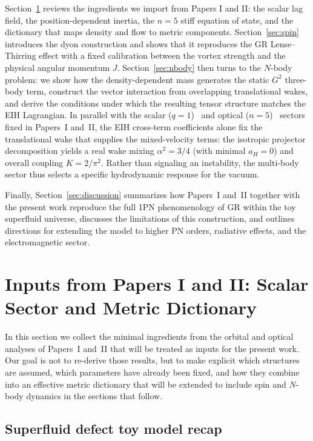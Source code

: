 \documentclass[11pt]{article}
\begin{document}
Section~\ref{sec:inputs} reviews the ingredients we import from Papers I and II:
the scalar lag field, the position-dependent inertia, the $n=5$ stiff equation
of state, and the dictionary that maps density and flow to metric components.
Section~\ref{sec:spin} introduces the dyon construction and shows that it
reproduces the GR Lense--Thirring effect with a fixed calibration between the
vortex strength and the physical angular momentum $J$.
Section~\ref{sec:nbody} then turns to the $N$-body problem: we show how the
density-dependent mass generates the static $G^2$ three-body term, construct
the vector interaction from overlapping translational wakes, and derive the
conditions under which the resulting tensor structure matches the EIH
Lagrangian.
In parallel with the scalar ($q=1$)~\cite{Norris:2025Orbits} and optical ($n=5$)~\cite{Norris:Paper2}
sectors fixed in Papers~I and~II, the EIH cross-term coefficients alone fix the
translational wake that supplies the mixed-velocity terms: the isotropic
projector decomposition yields a real wake mixing $\alpha^2=3/4$ (with minimal
$a_H=0$) and overall coupling $K=2/\pi^2$.
Rather than signaling an instability, the multi-body sector thus selects a
specific hydrodynamic response for the vacuum.

Finally, Section~\ref{sec:discussion} summarizes how Papers~I and~II together
with the present work reproduce the full 1PN phenomenology of GR within the toy
superfluid universe, discusses the limitations of this construction, and
outlines directions for extending the model to higher PN orders, radiative
effects, and the electromagnetic sector.

\section{Inputs from Papers I and II: Scalar Sector and Metric Dictionary}
\label{sec:inputs}

In this section we collect the minimal ingredients from the orbital
and optical analyses of Papers~I and~II that will be treated as inputs
for the present work.
Our goal is not to re-derive those results, but to make explicit
which structures are assumed, which parameters have already been fixed,
and how they combine into an effective metric dictionary that will be
extended to include spin and $N$-body dynamics in the sections that follow.

\subsection{Superfluid defect toy model recap}
\label{subsec:inputs-model}
\end{document}
